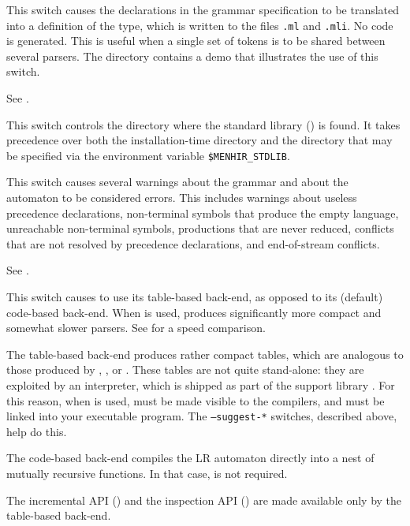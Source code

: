 \documentclass[onecolumn,11pt,nocopyrightspace,preprint]{sigplanconf}
\begin{document}
\docswitch{\oonlytokens} This switch causes the \dtoken declarations in
the grammar specification to be translated into a definition of the \token
type, which is written to the files \texttt{.ml} and
\texttt{.mli}. No code is generated. This is useful when
a single set of tokens is to be shared between several parsers. The directory
 contains a demo that illustrates the use of this switch.

\docswitch{\orawdepend} See .

 This switch controls the directory where
the standard library () is found. It takes precedence over
both the installation-time directory and the directory that may be specified
via the environment variable \verb+$MENHIR_STDLIB+.

\docswitch{\ostrict} This switch causes several warnings about the grammar
and about the automaton to be considered errors. This includes warnings about
useless precedence declarations, non-terminal symbols that produce the empty
language, unreachable non-terminal symbols, productions that are never
reduced, conflicts that are not resolved by precedence declarations, and
end-of-stream conflicts.

 See .

\docswitch{\otable} This switch causes \menhir to use its table-based
back-end, as opposed to its (default) code-based back-end. When \otable is
used, \menhir produces significantly more compact and somewhat slower parsers.
See  for a speed comparison.

The table-based back-end produces rather compact tables, which are analogous
to those produced by \yacc, \bison, or \ocamlyacc. These tables are not quite
stand-alone: they are exploited by an interpreter, which is shipped as part of
the support library \menhirlib. For this reason, when \otable is used,
\menhirlib must be made visible to the \ocaml compilers, and must be linked
into your executable program. The \texttt{--suggest-*} switches, described
above, help do this.

The code-based back-end compiles the LR automaton directly into a nest of
mutually recursive \ocaml functions. In that case, \menhirlib is not required.

The incremental API () and the inspection API
() are made available only by the table-based back-end.
\end{document}
